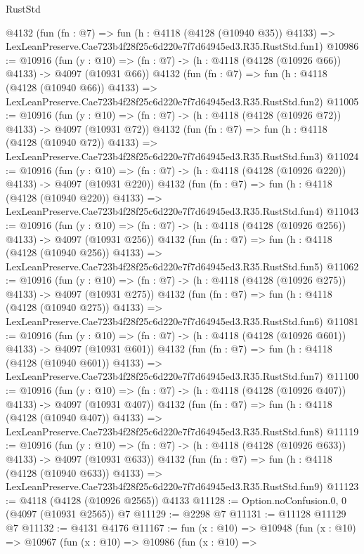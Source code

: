 \begin{lexlean}{RustStd}
\begin{coremodule}
    @4132
    (fun (fn : @7) =>
    fun (h : @4118 (@4128 (@10940 @35)) @4133) =>
    LexLeanPreserve.Cae723b4f28f25c6d220e7f7d64945ed3.R35.RustStd.fun1)
@10986 := @10916
    (fun (y : @10) => (fn : @7) -> (h : @4118 (@4128 (@10926 @66)) @4133) -> @4097 (@10931 @66))
    @4132
    (fun (fn : @7) =>
    fun (h : @4118 (@4128 (@10940 @66)) @4133) =>
    LexLeanPreserve.Cae723b4f28f25c6d220e7f7d64945ed3.R35.RustStd.fun2)
@11005 := @10916
    (fun (y : @10) => (fn : @7) -> (h : @4118 (@4128 (@10926 @72)) @4133) -> @4097 (@10931 @72))
    @4132
    (fun (fn : @7) =>
    fun (h : @4118 (@4128 (@10940 @72)) @4133) =>
    LexLeanPreserve.Cae723b4f28f25c6d220e7f7d64945ed3.R35.RustStd.fun3)
@11024 := @10916
    (fun (y : @10) => (fn : @7) -> (h : @4118 (@4128 (@10926 @220)) @4133) -> @4097 (@10931 @220))
    @4132
    (fun (fn : @7) =>
    fun (h : @4118 (@4128 (@10940 @220)) @4133) =>
    LexLeanPreserve.Cae723b4f28f25c6d220e7f7d64945ed3.R35.RustStd.fun4)
@11043 := @10916
    (fun (y : @10) => (fn : @7) -> (h : @4118 (@4128 (@10926 @256)) @4133) -> @4097 (@10931 @256))
    @4132
    (fun (fn : @7) =>
    fun (h : @4118 (@4128 (@10940 @256)) @4133) =>
    LexLeanPreserve.Cae723b4f28f25c6d220e7f7d64945ed3.R35.RustStd.fun5)
@11062 := @10916
    (fun (y : @10) => (fn : @7) -> (h : @4118 (@4128 (@10926 @275)) @4133) -> @4097 (@10931 @275))
    @4132
    (fun (fn : @7) =>
    fun (h : @4118 (@4128 (@10940 @275)) @4133) =>
    LexLeanPreserve.Cae723b4f28f25c6d220e7f7d64945ed3.R35.RustStd.fun6)
@11081 := @10916
    (fun (y : @10) => (fn : @7) -> (h : @4118 (@4128 (@10926 @601)) @4133) -> @4097 (@10931 @601))
    @4132
    (fun (fn : @7) =>
    fun (h : @4118 (@4128 (@10940 @601)) @4133) =>
    LexLeanPreserve.Cae723b4f28f25c6d220e7f7d64945ed3.R35.RustStd.fun7)
@11100 := @10916
    (fun (y : @10) => (fn : @7) -> (h : @4118 (@4128 (@10926 @407)) @4133) -> @4097 (@10931 @407))
    @4132
    (fun (fn : @7) =>
    fun (h : @4118 (@4128 (@10940 @407)) @4133) =>
    LexLeanPreserve.Cae723b4f28f25c6d220e7f7d64945ed3.R35.RustStd.fun8)
@11119 := @10916
    (fun (y : @10) => (fn : @7) -> (h : @4118 (@4128 (@10926 @633)) @4133) -> @4097 (@10931 @633))
    @4132
    (fun (fn : @7) =>
    fun (h : @4118 (@4128 (@10940 @633)) @4133) =>
    LexLeanPreserve.Cae723b4f28f25c6d220e7f7d64945ed3.R35.RustStd.fun9)
@11123 := @4118 (@4128 (@10926 @2565)) @4133
@11128 := Option.noConfusion.{0, 0} (@4097 (@10931 @2565)) @7
@11129 := @2298 @7
@11131 := @11128 @11129 @7
@11132 := @4131 @4176
@11167 := fun (x : @10) =>
  @10948
    (fun (x : @10) =>
    @10967
      (fun (x : @10) =>
      @10986
        (fun (x : @10) =>

\end{coremodule}
\end{lexlean}

